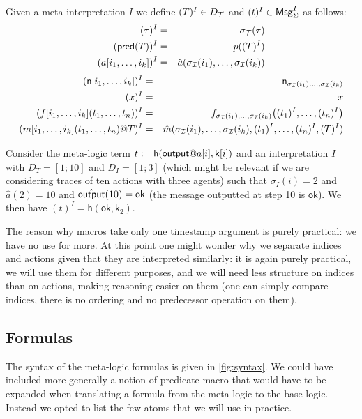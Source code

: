 \begin{definition}
  Given a meta-interpretation $I$
  we define $(T)^{I} \in D_{\mathcal{T}}$ and $(t)^{I} \in \mathsf{Msg}^I_\Sigma$ as follows:
  \begin{eqnarray*}
    (\tau)^{I} &=& \sigma_{\mathcal{T}}(\tau) \\
    (\textsf{pred}(T))^{I} &=& p((T)^{I}) \\
    (a[i_1,\ldots,i_k])^{I} &=& \hat{a}(\sigma_{\mathcal{I}}(i_1),\ldots,\sigma_{\mathcal{I}}(i_k))
  \end{eqnarray*}
  \begin{eqnarray*}
    (\mathsf{n}[i_1,\ldots,i_k])^{I} &=& \mathsf{n}_{\sigma_{\mathcal{I}}(i_1),\ldots,\sigma_{\mathcal{I}}(i_k)}
    \\
    (x)^{I} &=& x
    \\
    (f[i_1,\ldots,i_k](t_1,\ldots,t_n))^{I} &=&
    f_{\sigma_{\mathcal{I}}(i_1),\ldots,\sigma_{\mathcal{I}}(i_k)}\bigl(
      (t_1)^{I},\ldots,(t_n)^{I}
    \bigr)
    \\
    (m[i_1,\ldots,i_k](t_1,\ldots,t_n)@T)^{I} &=&
    \hat{m}(\sigma_{\mathcal{I}}(i_1),\ldots,\sigma_{\mathcal{I}}(i_k),
      (t_1)^{I},\ldots,(t_n)^{I},
      (T)^{I})
  \end{eqnarray*}
\end{definition}

\begin{example}
  Consider the meta-logic term $t := \mathsf{h}(\mout@a[i],\mathsf{k}[i])$
  and an interpretation $I$ with $D_T = [1;10]$ and $D_I = [1;3]$
  (which might be relevant if we are considering traces of ten actions
  with three agents) such that $\sigma_I(i)=2$ and $\hat{a}(2)=10$
  and $\hat{\textsf{output}}(10)=\mathsf{ok}$ (the message outputted at step 10
  is $\mathsf{ok}$).
  We then have $(t)^I = \mathsf{h}(\mathsf{ok},\mathsf{k}_2)$.
\end{example}

The reason why macros take only one timestamp argument is purely practical:
we have no use for more. At this point one might wonder why we separate 
indices and actions given that they are interpreted similarly: it is again
purely practical, we will use them for different purposes, and we will need
less structure on indices than on actions, making reasoning easier on them
(one can simply compare indices, there is no ordering and no predecessor
operation on them).

\subsection{Formulas}

The syntax of the meta-logic formulas is given in \cref{fig:syntax}.
We could have included more generally a notion of predicate macro that
would have to be expanded when translating a formula from the meta-logic
to the base logic. Instead we opted to list the few atoms that we
will use in practice.

